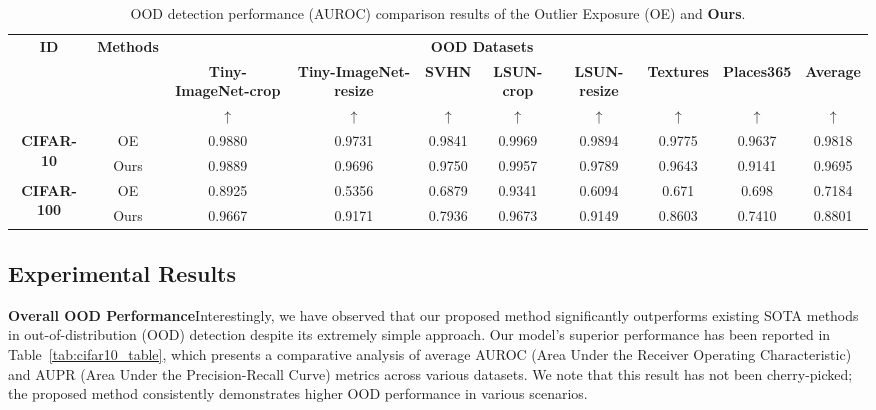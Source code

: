 \documentclass[letterpaper]{article} %
\begin{document}
\begin{table}[!ht]
\renewcommand\arraystretch{1.0}
\begin{adjustbox}{width=17.8cm,center}
\begin{tabular}{c|c|ccccccc|c} \toprule
\multirow{3}{*}{\textbf{ID}} & \multirow{3}{*}{\textbf{Methods}} & \multicolumn{7}{c}{\textbf{OOD Datasets}} \\
 &  & \multicolumn{1}{c}{\textbf{Tiny-ImageNet-crop}} & \multicolumn{1}{c}{\textbf{Tiny-ImageNet-resize}} & \multicolumn{1}{c}{\textbf{SVHN}} & \multicolumn{1}{c}{\textbf{LSUN-crop}} & \multicolumn{1}{c}{\textbf{LSUN-resize}} & \multicolumn{1}{c}{\textbf{Textures}} & \multicolumn{1}{c|}{\textbf{Places365}}& \multicolumn{1}{c}{\textbf{Average}} \\
 &  & $\uparrow$ & $\uparrow$ & $\uparrow$ & $\uparrow$ & $\uparrow$ & $\uparrow$ & $\uparrow$ & $\uparrow$\\ \midrule
\multirow{2}{*}{\textbf{CIFAR-10}}
 & OE  &0.9880	&0.9731	&0.9841	&0.9969	&0.9894	&0.9775	&0.9637	&0.9818\\
\cline{2-10}
 & Ours &0.9889	&0.9696	&0.9750	&0.9957	&0.9789	&0.9643	&0.9141	&0.9695\\
 \hline
 \multirow{2}{*}{\textbf{CIFAR-100}}
 & OE   &0.8925	&0.5356	&0.6879	&0.9341	&0.6094	&0.671	&0.698	&0.7184\\
\cline{2-10}
 & Ours &0.9667	&0.9171	&0.7936	&0.9673	&0.9149	&0.8603	&0.7410	&0.8801\\
 \bottomrule
\end{tabular}
\end{adjustbox}
\caption{OOD detection performance (AUROC) comparison results of the Outlier Exposure (OE) and \textbf{Ours}.}
\label{tab:OE_comparison_table}
\end{table}

\subsection{Experimental Results}
\textbf{Overall OOD Performance}\indent Interestingly, we have observed that our proposed method significantly outperforms existing SOTA methods in out-of-distribution (OOD) detection despite its extremely simple approach. Our model's superior performance has been reported in Table~\ref{tab:cifar10_table}, which presents a comparative analysis of average AUROC (Area Under the Receiver Operating Characteristic) and AUPR (Area Under the Precision-Recall Curve) metrics across various datasets. We note that this result has not been cherry-picked; the proposed method consistently demonstrates higher OOD performance in various scenarios.
\end{document}
